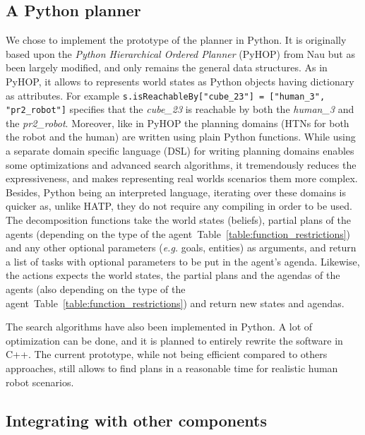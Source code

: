 \documentclass[a4paper,11pt,twoside]{StyleThese}
\begin{document}
\subsection{A Python planner}
We chose to implement the prototype of the planner in Python. It is originally based upon the \textit{Python Hierarchical Ordered Planner} (PyHOP) from Nau but as been largely modified, and only remains the general data structures. As in PyHOP, it allows to represents world states as Python objects having dictionary as attributes. For example \verb|s.isReachableBy["cube_23"] = ["human_3", "pr2_robot"]| specifies that the \textit{cube\_23} is reachable by both the \textit{human\_3} and the \textit{pr2\_robot}.
Moreover, like in PyHOP the planning domains (HTNs for both the robot and the human) are written using plain Python functions. While using a separate domain specific language (DSL) for writing planning domains enables some optimizations and advanced search algorithms, it tremendously reduces the expressiveness, and makes representing real worlds scenarios them more complex. Besides, Python being an interpreted language, iterating over these domains is quicker as, unlike HATP, they do not require any compiling in order to be used.
The decomposition functions take the world states (beliefs), partial plans of the agents (depending on the type of the agent~Table~\ref{table:function_restrictions}) and any other optional parameters (\textit{e.g.} goals, entities) as arguments, and return a list of tasks with optional parameters to be put in the agent's agenda. Likewise, the actions expects the world states, the partial plans and the agendas of the agents (also depending on the type of the agent~Table~\ref{table:function_restrictions}) and return new states and agendas.

The search algorithms have also been implemented in Python. A lot of optimization can be done, and it is planned to entirely rewrite the software in C++. The current prototype, while not being efficient compared to others approaches, still allows to find plans in a reasonable time for realistic human robot scenarios.

\subsection{Integrating with other components}
\end{document}
